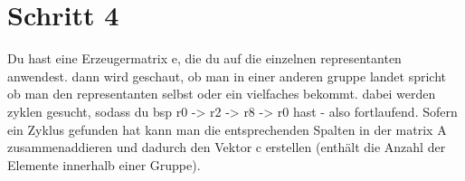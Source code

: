 \section{Schritt 4}
Du hast eine Erzeugermatrix e, die du auf die einzelnen representanten anwendest. dann wird geschaut, ob man in einer anderen gruppe landet spricht ob man den representanten selbst oder ein vielfaches bekommt. dabei werden zyklen gesucht, sodass du bsp r0 -> r2 -> r8 -> r0 hast - also fortlaufend. Sofern ein Zyklus gefunden hat kann man die entsprechenden Spalten in der matrix A zusammenaddieren und dadurch den Vektor c erstellen (enthält die Anzahl der Elemente innerhalb einer Gruppe).